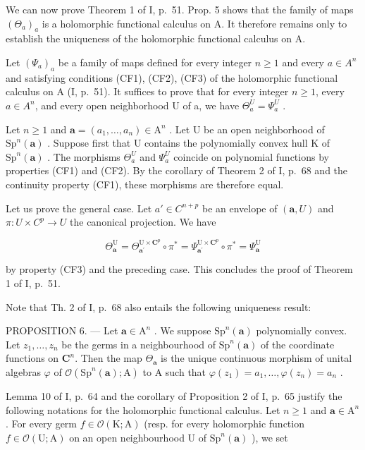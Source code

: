 We can now prove Theorem 1 of I, p.~51. Prop. 5 shows that the family of maps \((\Theta_{a})_{a}\) is a holomorphic functional calculus on A. It therefore remains only to establish the uniqueness of the holomorphic functional calculus on A.

Let \((\Psi_{a})_{a}\) be a family of maps defined for every integer \(n \geqslant 1\) and every \(a \in A^{n}\) and satisfying conditions (CF1), (CF2), (CF3) of the holomorphic functional calculus on A (I, p.~51). It suffices to prove that for every integer \(n \geqslant 1\), every \(a \in A^{n}\), and every open neighborhood U of a, we have \(\Theta_{a}^{U} = \Psi_{a}^{U}\) .

Let \(n \geqslant 1\) and \(\boldsymbol{a} = (a_{1}, \ldots, a_{n}) \in \mathrm{A}^{n}\) . Let U be an open neighborhood of \(\mathrm{Sp}^{n}(\boldsymbol{a})\) . Suppose first that U contains the polynomially convex hull K of \(\mathrm{Sp}^{n}(\boldsymbol{a})\) . The morphisms \(\Theta_{a}^{U}\) and \(\Psi_{a}^{U}\) coincide on polynomial functions by properties (CF1) and (CF2). By the corollary of Theorem 2 of I, p.~68 and the continuity property (CF1), these morphisms are therefore equal.

Let us prove the general case. Let \(a' \in C^{n+p}\) be an envelope of \((\boldsymbol{a}, U)\) and \(\pi: U \times C^{p} \to U\) the canonical projection. We have

\[
\Theta_ {\boldsymbol {a}} ^ {\mathrm{U}} = \Theta_ {\boldsymbol {a} ^ {\prime}} ^ {\mathrm{U} \times \mathbf {C} ^ {p}} \circ \pi^ {*} = \Psi_ {\boldsymbol {a} ^ {\prime}} ^ {\mathrm{U} \times \mathbf {C} ^ {p}} \circ \pi^ {*} = \Psi_ {\boldsymbol {a}} ^ {\mathrm{U}}
\]

by property (CF3) and the preceding case. This concludes the proof of Theorem 1 of I, p.~51.

Note that Th. 2 of I, p.~68 also entails the following uniqueness result:

PROPOSITION 6. --- Let \(\boldsymbol{a} \in \mathrm{A}^n\) . We suppose \(\mathrm{Sp}^n(\boldsymbol{a})\) polynomially convex. Let \(z_1, \ldots, z_n\) be the germs in a neighbourhood of \(\mathrm{Sp}^n(\boldsymbol{a})\) of the coordinate functions on \(\mathbf{C}^n\). Then the map \(\Theta_{\boldsymbol{a}}\) is the unique continuous morphism of unital algebras \(\varphi\) of \(\mathcal{O}(\mathrm{Sp}^n(\boldsymbol{a}); \mathrm{A})\) to A such that \(\varphi(z_1) = a_1, \ldots, \varphi(z_n) = a_n\) .

Lemma 10 of I, p.~64 and the corollary of Proposition 2 of I, p.~65 justify the following notations for the holomorphic functional calculus. Let \(n \geqslant 1\) and \(\boldsymbol{a} \in \mathrm{A}^n\) . For every germ \(f \in \mathcal{O}(\mathrm{K};\mathrm{A})\) (resp. for every holomorphic function \(f \in \mathcal{O}(\mathrm{U};\mathrm{A})\) on an open neighbourhood U of \(\mathrm{Sp}^n (\boldsymbol{a})\) ), we set

